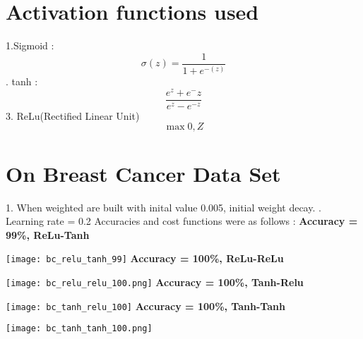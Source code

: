 \documentclass[a4paper,12pt]{article}
\begin{document}
    \section*{Activation functions used}
    1.Sigmoid : 
                $$
                \sigma(z) = \frac{1}{1 + e^{-(z)}}
                $$
    . tanh :  $$
                \frac{e^{z} + e^-{z}}{e^{z} - e^{-z}}
               $$
    3. ReLu(Rectified Linear Unit)
               $$
                \max{{0}, {Z}}
               $$
    \section*{On Breast Cancer Data Set}
    1. When weighted are built with inital value 0.005, initial weight decay.
    \newline{}. Learning rate = 0.2
    \newline\newline
    Accuracies and cost functions were as follows : 
    \newline\newline
    \textbf{Accuracy = 99\%, ReLu-Tanh}
    \newline\newline
    \graphicspath{ {./images/} }
    \texttt{[image: bc\_relu\_tanh\_99]}
    \newline\newline\newline
    \textbf{Accuracy = 100\%, ReLu-ReLu}
    \newline\newline
    \graphicspath{ {./images/} }
    \texttt{[image: bc\_relu\_relu\_100.png]}
    \newline
    \newline\newline\newline
    \textbf{Accuracy = 100\%, Tanh-Relu}
    \newline\newline
    \graphicspath{ {./images/} }
    \texttt{[image: bc\_tanh\_relu\_100]}
    \newline
    \newline\newline\newpage
    \textbf{Accuracy = 100\%, Tanh-Tanh}
    \newline\newline\newlinw
    \graphicspath{ {./images/} }
    \texttt{[image: bc\_tanh\_tanh\_100.png]}
    \newline
    
\end{document}
